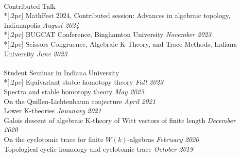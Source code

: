 \documentclass{article}
\begin{document}
\\
{ \large Contributed Talk} \\*[.2pc]
{MathFest 2024, Contributed session: Advances in algebraic topology, Indianapolis} \hfill {\it August 2024\/}  \\*[.2pc]
{BUGCAT Conference, Binghamton University} \hfill {\it November 2023\/}  \\*[.2pc]
{Scissors Congruence, Algebraic K-Theory, and Trace Methods, Indiana University} \hfill {\it June 2023\/}  \\
\\
{ \large Student Seminar in Indiana University} \\*[.2pc]
{Equivariant stable homotopy theory} \hfill {\it Fall 2023\/} \\
{Spectra and stable homotopy theory} \hfill {\it May 2023\/} \\
{On the Quillen-Lichtenbaum conjecture} \hfill {\it April 2021\/} \\
{Lower K-theories} \hfill {\it Janunary 2021\/} \\
{Galois descent of algebraic K-theory of Witt vectors of finite length} \hfill {\it December 2020\/} \\
{On the cyclotomic trace for finite $W(k)$-algebras} \hfill {\it February 2020\/} \\
{Topological cyclic homology and cyclotomic trace} \hfill {\it October 2019\/} \\
\end{document}
